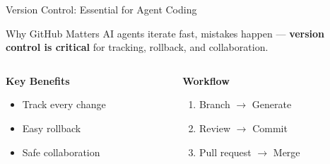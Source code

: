 \documentclass[aspectratio=169]{beamer}
\begin{document}
\begin{frame}{Version Control: Essential for Agent Coding}
  \begin{block}{Why GitHub Matters}
    AI agents iterate fast, mistakes happen --- \textbf{version control is critical} for tracking, rollback, and collaboration.
  \end{block}

  \vspace{0.5cm}

  \begin{columns}[T]
    \begin{column}{0.48\textwidth}
      \centering
      \large\bfseries
      \textcolor{conesaTeal}{Key Benefits}

      \vspace{0.3cm}
      \normalsize

      \begin{itemize}
        \item Track every change
        \item Easy rollback
        \item Safe collaboration
      \end{itemize}
    \end{column}
    \begin{column}{0.48\textwidth}
      \centering
      \large\bfseries
      \textcolor{conesaOrange}{Workflow}

      \vspace{0.3cm}
      \normalsize

      \begin{enumerate}
        \item Branch $\rightarrow$ Generate
        \item Review $\rightarrow$ Commit
        \item Pull request $\rightarrow$ Merge
      \end{enumerate}
    \end{column}
  \end{columns}
\end{frame}
\end{document}

